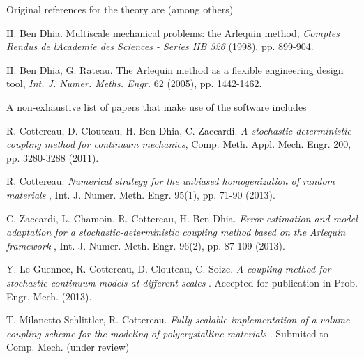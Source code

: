 Original references for the theory are (among others)


\begin{DoxyEnumerate}
\item H. Ben Dhia. Multiscale mechanical problems\+: the Arlequin method, {\itshape Comptes Rendus de l\textquotesingle{}Academie des Sciences -\/ Series I\+I\+B 326} (1998), pp. 899-\/904.
\item H. Ben Dhia, G. Rateau. The Arlequin method as a flexible engineering design tool, {\itshape Int. J. Numer. Meths. Engr.} 62 (2005), pp. 1442-\/1462.
\end{DoxyEnumerate}

A non-\/exhaustive list of papers that make use of the software includes


\begin{DoxyEnumerate}
\item R. Cottereau, D. Clouteau, H. Ben Dhia, C. Zaccardi. {\itshape A stochastic-\/deterministic coupling method for continuum mechanics}, Comp. Meth. Appl. Mech. Engr. 200, pp. 3280-\/3288 (2011).
\item R. Cottereau. {\itshape Numerical strategy for the unbiased homogenization of random materials} , Int. J. Numer. Meth. Engr. 95(1), pp. 71-\/90 (2013).
\item C. Zaccardi, L. Chamoin, R. Cottereau, H. Ben Dhia. {\itshape Error estimation and model adaptation for a stochastic-\/deterministic coupling method based on the Arlequin framework} , Int. J. Numer. Meth. Engr. 96(2), pp. 87-\/109 (2013).
\item Y. Le Guennec, R. Cottereau, D. Clouteau, C. Soize. {\itshape A coupling method for stochastic continuum models at different scales} . Accepted for publication in Prob. Engr. Mech. (2013).
\item T. Milanetto Schlittler, R. Cottereau. {\itshape Fully scalable implementation of a volume coupling scheme for the modeling of polycrystalline materials} . Submited to Comp. Mech. (under review) 
\end{DoxyEnumerate}